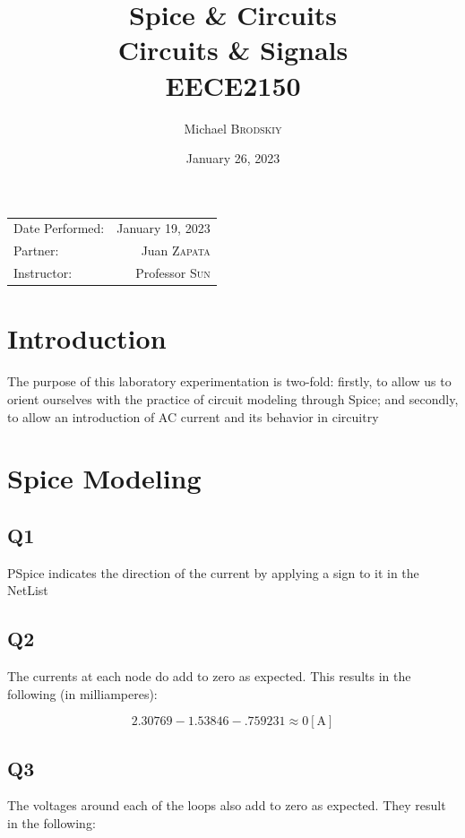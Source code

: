 \documentclass[
	letterpaper, %
	10pt, %
]{CSUniSchoolLabReport}
\title{Spice \& Circuits \\ Circuits \& Signals \\ EECE2150} %
\author{Michael \textsc{Brodskiy}}
\date{January 26, 2023} %
\begin{document}
\maketitle %

\begin{center}
	\begin{tabular}{l r}
		Date Performed: & January 19, 2023 \\ %
        Partner: & Juan \textsc{Zapata} \\ %
		Instructor: & Professor \textsc{Sun} %
	\end{tabular}
\end{center}

\setcounter{section}{-1}

\section{Introduction}

The purpose of this laboratory experimentation is two-fold: firstly, to allow us to orient ourselves with the practice of circuit modeling through Spice; and secondly, to allow an introduction of AC current and its behavior in circuitry

\section{Spice Modeling}

\subsection{Q1} PSpice indicates the direction of the current by applying a sign to it in the NetList

\subsection{Q2} The currents at each node do add to zero as expected. This results in the following (in milliamperes):

\begin{equation}
  2.30769 - 1.53846 - .759231 \approx 0 [\si{\ampere}]
  \label{eq:1}
\end{equation}

\subsection{Q3} The voltages around each of the loops also add to zero as expected. They result in the following:
\end{document}
